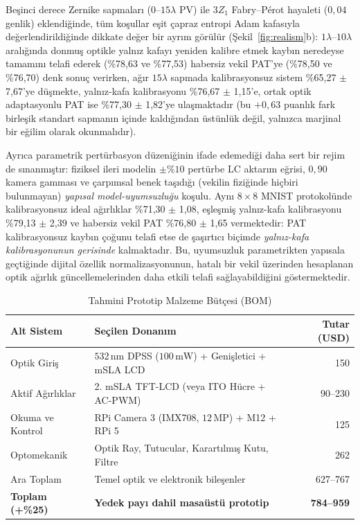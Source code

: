 \documentclass[journal]{IEEEtran}
\begin{document}
Be\c{s}inci derece Zernike sapmalar\i{} ($0\text{--}15\lambda$ PV) ile $3Z_1$ Fabry--P\'erot hayaleti ($0{,}04$ genlik) eklendi\u{g}inde, t\"um ko\c{s}ullar e\c{s}it \c{c}apraz entropi Adam kafas\i{}yla de\u{g}erlendirildi\u{g}inde dikkate de\u{g}er bir ayr\i{}m g\"or\"ul\"ur (\c{S}ekil~\ref{fig:realism}b): $1\lambda$--$10\lambda$ aral\i{}\u{g}\i{}nda donmu\c{s} optikle yaln\i{}z kafay\i{} yeniden kalibre etmek kayb\i{}n neredeyse tamam\i{}n\i{} telafi ederek (\%78,63 ve \%77,53) habersiz vekil PAT'ye (\%78,50 ve \%76,70) denk sonu\c{c} verirken, a\u{g}\i{}r $15\lambda$ sapmada kalibrasyonsuz sistem \%65,27 $\pm$ 7,67'ye d\"u\c{s}mekte, yaln\i{}z-kafa kalibrasyonu \%76,67 $\pm$ 1,15'e, ortak optik adaptasyonlu PAT ise \%77,30 $\pm$ 1,82'ye ula\c{s}maktad\i{}r (bu $+0{,}63$ puanl\i{}k fark birle\c{s}ik standart sapman\i{}n i\c{c}inde kald\i{}\u{g}\i{}ndan \"ust\"unl\"uk de\u{g}il, yaln\i{}zca marjinal bir e\u{g}ilim olarak okunmal\i{}d\i{}r).

Ayr\i{}ca parametrik pert\"urbasyon d\"uzeni\u{g}inin ifade edemedi\u{g}i daha sert bir rejim de s\i{}nanm\i{}\c{s}t\i{}r: fiziksel ileri modelin $\pm\%10$ pert\"urbe LC aktar\i{}m e\u{g}risi, $0{,}90$ kamera gammas\i{} ve \c{c}arp\i{}msal benek ta\c{s}\i{}d\i{}\u{g}\i{} (vekilin fizi\u{g}inde hi\c{c}biri bulunmayan) \emph{yap\i{}sal model-uyumsuzlu\u{g}u} ko\c{s}ulu. Ayn\i{} $8\times 8$ MNIST protokol\"unde kalibrasyonsuz ideal a\u{g}\i{}rl\i{}klar \%71,30 $\pm$ 1,08, e\c{s}le\c{s}mi\c{s} yaln\i{}z-kafa kalibrasyonu \%79,13 $\pm$ 2,39 ve habersiz vekil PAT \%76,80 $\pm$ 1,65 vermektedir: PAT kalibrasyonsuz kayb\i{}n \c{c}o\u{g}unu telafi etse de \c{s}a\c{s}\i{}rt\i{}c\i{} bi\c{c}imde \emph{yaln\i{}z-kafa kalibrasyonunun gerisinde} kalmaktad\i{}r. Bu, uyumsuzluk parametrikten yap\i{}sala ge\c{c}ti\u{g}inde dijital \"ozellik normalizasyonunun, hatal\i{} bir vekil \"uzerinden hesaplanan optik a\u{g}\i{}rl\i{}k g\"uncellemelerinden daha etkili telafi sa\u{g}layabildi\u{g}ini g\"ostermektedir.

\begin{table}[!t]
  \centering
  \caption{Tahmini Prototip Malzeme B\"ut\c{c}esi (BOM)}
  \label{tab:bom}
  \begin{tabular}{@{}llr@{}}
    \toprule
    \textbf{Alt Sistem} & \textbf{Se\c{c}ilen Donan\i{}m} & \textbf{Tutar (USD)} \\
    \midrule
    Optik Giri\c{s} & $532\,\text{nm}$ DPSS ($100\,\text{mW}$) + Geni\c{s}letici + mSLA LCD & 150 \\
    Aktif A\u{g}\i{}rl\i{}klar & 2. mSLA TFT-LCD (veya ITO H\"ucre + AC-PWM) & 90--230 \\
    Okuma ve Kontrol & RPi Camera 3 (IMX708, $12\,\text{MP}$) + M12 + RPi 5 & 125 \\
    Optomekanik & Optik Ray, Tutucular, Karart\i{}lm\i{}\c{s} Kutu, Filtre & 262 \\
    \midrule
    Ara Toplam & Temel optik ve elektronik bile\c{s}enler & 627--767 \\
    \textbf{Toplam (+\%25)} & \textbf{Yedek pay\i{} dahil masa\"ust\"u prototip} & \textbf{784--959} \\
    \bottomrule
  \end{tabular}
\end{table}
\end{document}
